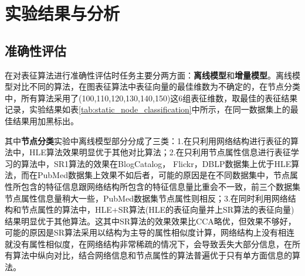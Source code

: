 \section{实验结果与分析}
\subsection{准确性评估}
在对表征算法进行准确性评估时任务主要分两方面：\textbf{离线模型}和\textbf{增量模型}。离线模型对比不同的算法，在图表征算法中表征向量的最佳维数为不确定的，在节点分类中，所有算法采用了(100,110,120,130,140,150)这6组表征维数，取最佳的表征结果记录，实验结果如表\ref{tab:static_node_classification}中所示，在同一数据集上的最佳结果用加黑标出。

其中\textbf{节点分类}实验中离线模型部分分成了三类：1.在只利用网络结构进行表征的算法中，HLE算法效果明显优于其他对比算法；2.在只利用节点属性信息进行表征学习的算法中，SR1算法的效果在BlogCatalog， Flickr，DBLP数据集上优于HLE算法，而在PubMed数据集上效果不如后者，可能的原因是在不同数据集中，节点属性所包含的特征信息跟网络结构所包含的特征信息量比重会不一致，前三个数据集节点属性信息量稍大一些，PubMed数据集节点属性则相反；3.在同时利用网络结构和节点属性的算法中，HLE+SR算法(HLE的表征向量并上SR算法的表征向量)结果明显优于其他算法。这其中SR算法的效果效果比CCA略优，但效果不够好，可能的原因是SR算法采用以结构为主导的属性相似度计算，网络结构上没有相连就没有属性相似度，在网络结构非常稀疏的情况下，会导致丢失大部分信息，在所有算法中纵向对比，结合网络信息和节点属性的算法普遍优于只有单方面信息的算法。

